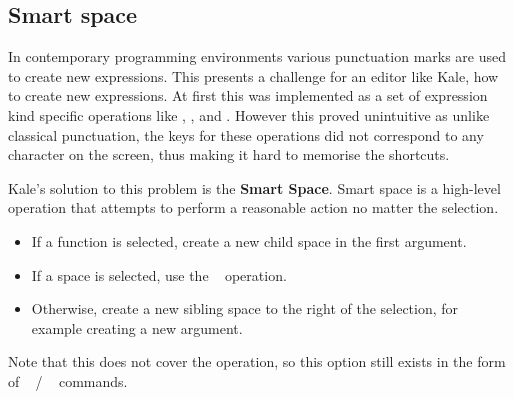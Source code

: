 \subsection{Smart space}
In contemporary programming environments various punctuation marks are used to
create new expressions. This presents a challenge for an editor like Kale, how
to create new expressions. At first this was implemented as a set of
expression kind specific operations like , , and . However this proved unintuitive as
unlike classical punctuation, the keys for these operations did not correspond
to any character on the screen, thus making it hard to memorise the shortcuts.

Kale's solution to this problem is the \textbf{Smart Space}. Smart space is a
high-level operation that attempts to perform a reasonable action no matter the
selection.

\begin{samepage}
\begin{itemize}[noitemsep]
	\item If a function is selected, create a new child space in the first
argument.
	\item If a space is selected, use the
	\hyperref[cmd:up_down]{}~ operation.
	\item Otherwise, create a new sibling space to the right of the selection, for
example creating a new argument.
\end{itemize}
\end{samepage}

Note that this does not cover the  operation, so this
option still exists in the form of
\hyperref[cmd:new_line]{}~ /
\hyperref[cmd:new_line]{}~ commands.


